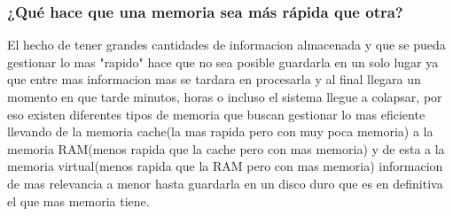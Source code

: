 \documentclass{article}
\begin{document}
\subsubsection{¿Qué hace que una memoria sea más rápida que otra?}
{\raggedleft
El hecho de tener grandes cantidades de informacion almacenada y que se pueda gestionar lo mas "rapido" hace que no sea posible guardarla en un solo lugar ya que entre mas informacion mas se tardara en procesarla y al final llegara un momento en que tarde minutos, horas o incluso el sistema llegue a colapsar, por eso existen diferentes tipos de memoria que buscan gestionar lo mas eficiente llevando de la memoria cache(la mas rapida pero con muy poca memoria) a la memoria RAM(menos rapida que la cache pero con mas memoria) y de esta a la memoria virtual(menos rapida que la RAM pero con mas memoria) informacion de mas relevancia a menor hasta guardarla en un disco duro que es en definitiva el que mas memoria tiene.
}
\newpage


\end{document}
